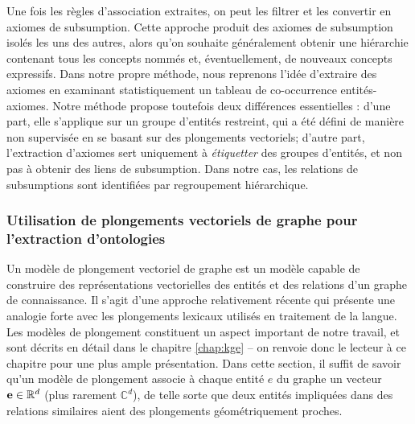 Une fois les règles d'association extraites, on peut les filtrer et les convertir en axiomes de subsumption. Cette approche produit des axiomes de subsumption isolés les uns des autres, alors qu'on souhaite généralement obtenir une hiérarchie contenant tous les concepts nommés et, éventuellement, de nouveaux concepts expressifs. Dans notre propre méthode, nous reprenons l'idée d'extraire des axiomes en examinant statistiquement un tableau de co-occurrence entités-axiomes. Notre méthode propose toutefois deux différences essentielles : d'une part, elle s'applique sur un groupe d'entités restreint, qui a été défini de manière non supervisée en se basant sur des plongements vectoriels; d'autre part, l'extraction d'axiomes sert uniquement à \textit{étiquetter} des groupes d'entités, et non pas à obtenir des liens de subsumption. Dans notre cas, les relations de subsumptions sont identifiées par regroupement hiérarchique.



\subsubsection{Utilisation de plongements vectoriels de graphe pour l'extraction d'ontologies}

Un modèle de plongement vectoriel de graphe est un modèle capable de construire des représentations vectorielles des entités et des relations d'un graphe de connaissance. Il s'agit d'une approche relativement récente qui présente une analogie forte avec les plongements lexicaux utilisés en traitement de la langue. Les modèles de plongement constituent un aspect important de notre travail, et sont décrits en détail dans le chapitre \ref{chap:kge} – on renvoie donc le lecteur à ce chapitre pour une plus ample présentation. Dans cette section, il suffit de savoir qu'un modèle de plongement associe à chaque entité $e$ du graphe un vecteur $\textbf{e} \in \mathbb{R}^d$ (plus rarement $\mathbb{C}^d$), de telle sorte que deux entités impliquées dans des relations similaires aient des plongements géométriquement proches.

